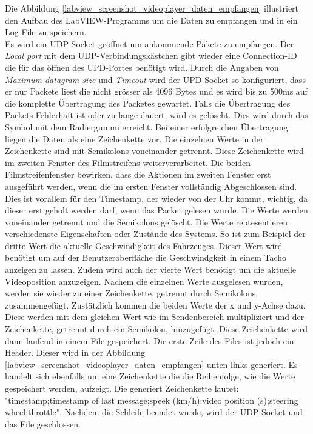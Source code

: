 Die Abbildung \ref{labview_screenshot_videoplayer_daten_empfangen} illustriert den Aufbau des LabVIEW-Programms um die Daten zu empfangen und in ein Log-File zu speichern.\\
Es wird ein UDP-Socket geöffnet um ankommende Pakete zu empfangen. Der \textit{Local port} mit dem UDP-Verbindungskästchen gibt wieder eine Connection-ID die für das öffnen des UPD-Portes benötigt wird. Durch die Angaben von \textit{Maximum datagram size} und \textit{Timeout} wird der UPD-Socket so konfiguriert, dass er nur Packete liest die nicht grösser als 4096 Bytes und es wird bis zu 500ms auf die komplette Übertragung des Packetes gewartet. Falls die Übertragung des Packets Fehlerhaft ist oder zu lange dauert, wird es gelöscht. Dies wird durch das Symbol mit dem Radiergummi erreicht. Bei einer erfolgreichen Übertragung liegen die Daten als eine Zeichenkette vor. Die einzelnen Werte in der Zeichenkette sind mit Semikolons voneinander getrennt. Diese Zeichenkette wird im zweiten Fenster des Filmstreifens weiterverarbeitet. Die beiden Filmstreifenfenster bewirken, dass die Aktionen im zweiten Fenster erst ausgeführt werden, wenn die im ersten Fenster vollständig Abgeschlossen sind. Dies ist vorallem für den Timestamp, der wieder von der Uhr kommt, wichtig, da dieser erst geholt werden darf, wenn das Packet gelesen wurde. Die Werte werden voneinander getrennt und die Semikolons gelöscht. Die Werte reptesentieren verschiedenste Eigenschaften oder Zustände des Systems. So ist zum Beispiel der dritte Wert die aktuelle Geschwindigkeit des Fahrzeuges. Dieser Wert wird benötigt um auf der Benutzeroberfläche die Geschwindgkeit in einem Tacho anzeigen zu lassen. Zudem wird auch der vierte Wert benötigt um die aktuelle Videoposition anzuzeigen. Nachem die einzelnen Werte ausgelesen wurden, werden sie wieder zu einer Zeichenkette, getrennt durch Semikolons, zusammengefügt. Zustätzlich kommen die beiden Werte der x und y-Achse dazu. Diese werden mit dem gleichen Wert wie im Sendenbereich multipliziert und der Zeichenkette, getrennt durch ein Semikolon, hinzugefügt.  Diese Zeichenkette wird dann laufend in einem File gespeichert. Die erste Zeile des Files ist jedoch ein Header. Dieser wird in der Abbildung \ref{labview_screenshot_videoplayer_daten_empfangen} unten links generiert. Es handelt sich ebenfalls um eine Zeichenkette die die Reihenfolge, wie die Werte gespeichert werden, aufzeigt. Die generiert Zeichenkette lautet: "timestamp;timestamp of last message;speek (km/h);video position (s);steering wheel;throttle". Nachdem die Schleife beendet wurde, wird der UDP-Socket und das File geschlossen.

